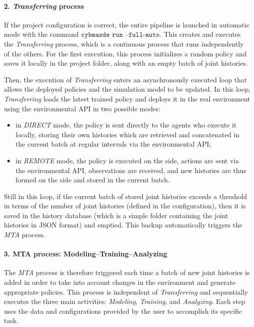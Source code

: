 \paragraph{2. \textit{Transferring} process}

If the project configuration is correct, the entire pipeline is launched in automatic mode with the command $\texttt{cybmasde run --full-auto}$. This creates and executes the \textit{Transferring} process, which is a continuous process that runs independently of the others. For the first execution, this process initializes a random policy and saves it locally in the project folder, along with an empty batch of joint histories.

Then, the execution of \textit{Transferring} enters an asynchronously executed loop that allows the deployed policies and the simulation model to be updated. In this loop, \textit{Transferring} loads the latest trained policy and deploys it in the real environment using the environmental API in two possible modes:
\begin{itemize}
  \item in \textit{DIRECT} mode, the policy is sent directly to the agents who execute it locally, storing their own histories which are retrieved and concatenated in the current batch at regular intervals via the environmental API;
  \item in \textit{REMOTE} mode, the policy is executed on the  side, actions are sent via the environmental API, observations are received, and new histories are thus formed on the  side and stored in the current batch.
\end{itemize}

Still in this loop, if the current batch of stored joint histories exceeds a threshold in terms of the number of joint histories (defined in the configuration), then it is saved in the history database (which is a simple folder containing the joint histories in JSON format) and emptied. This backup automatically triggers the \textit{MTA} process.

\paragraph {3. MTA process: Modeling–Training–Analyzing}

The \textit{MTA} process is therefore triggered each time a batch of new joint histories is added in order to take into account changes in the environment and generate appropriate policies. This process is independent of \textit{Transferring} and sequentially executes the three main activities: \textit{Modeling}, \textit{Training}, and \textit{Analyzing}. Each step uses the data and configurations provided by the user to accomplish its specific task.

